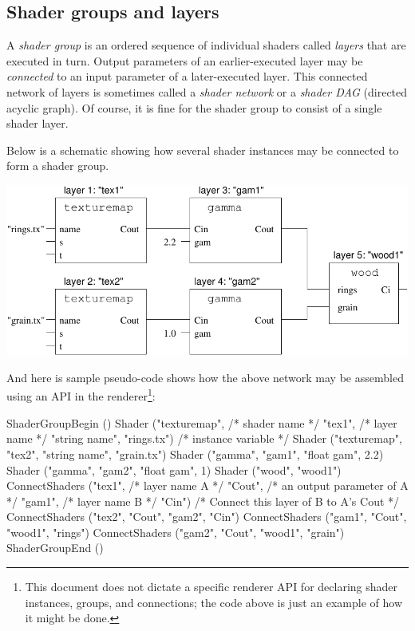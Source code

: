 \documentclass[11pt,letterpaper]{book}
\begin{document}
\medskip



\subsection*{Shader groups and layers}

A \emph{shader group} is an ordered sequence of individual shaders
called \emph{layers} that are executed in turn.  Output parameters of an
earlier-executed layer may be \emph{connected} to an input parameter of
a later-executed layer.  This connected network of layers is sometimes
called a \emph{shader network} or a \emph{shader DAG} (directed acyclic
graph).  Of course, it is fine for the shader group to consist of a
single shader layer.

Below is a schematic showing how several shader instances may be
connected to form a shader group.

\bigskip

\noindent \includegraphics{Figures/groupschematic}

\bigskip

\noindent And here is sample pseudo-code shows how the above network may
be assembled using an API in the renderer\footnote{This document does
not dictate a specific renderer API for declaring shader instances,
groups, and connections; the code above is just an example of how
it might be done.}:

\begin{code}
    ShaderGroupBegin ()
    Shader ("texturemap",               /* shader name */
            "tex1",                     /* layer name */
            "string name", "rings.tx")  /* instance variable */
    Shader ("texturemap", "tex2", "string name", "grain.tx")
    Shader ("gamma", "gam1", "float gam", 2.2)
    Shader ("gamma", "gam2", "float gam", 1)
    Shader ("wood", "wood1")
    ConnectShaders ("tex1",     /* layer name A */
                    "Cout",     /* an output parameter of A */
                    "gam1",     /* layer name B */
                    "Cin")      /* Connect this layer of B to A's Cout */
    ConnectShaders ("tex2", "Cout", "gam2", "Cin")
    ConnectShaders ("gam1", "Cout", "wood1", "rings")
    ConnectShaders ("gam2", "Cout", "wood1", "grain")
    ShaderGroupEnd ()
\end{code}
\end{document}
